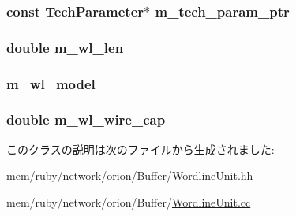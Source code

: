 \label{classWordlineUnit_aab5dce4213ab482c5e1909bfc96d62af}
\hypertarget{classWordlineUnit_a11d1644aa2bfe0e16783dface6fadf13}{
\subsubsection[{m\_\-tech\_\-param\_\-ptr}]{\setlength{\rightskip}{0pt plus 5cm}const {\bf TechParameter}$\ast$ {\bf m\_\-tech\_\-param\_\-ptr}}}
\label{classWordlineUnit_a11d1644aa2bfe0e16783dface6fadf13}
\hypertarget{classWordlineUnit_af094edaeaf3975456c048ce02fa9585c}{
\subsubsection[{m\_\-wl\_\-len}]{\setlength{\rightskip}{0pt plus 5cm}double {\bf m\_\-wl\_\-len}}}
\label{classWordlineUnit_af094edaeaf3975456c048ce02fa9585c}
\hypertarget{classWordlineUnit_a0641127826ee8c6f7635f4f7997d94c3}{
\subsubsection[{m\_\-wl\_\-model}]{ {\bf m\_\-wl\_\-model}}}
\label{classWordlineUnit_a0641127826ee8c6f7635f4f7997d94c3}
\hypertarget{classWordlineUnit_a156bb193afe5dc1b16642b7a42e3fc0f}{
\subsubsection[{m\_\-wl\_\-wire\_\-cap}]{\setlength{\rightskip}{0pt plus 5cm}double {\bf m\_\-wl\_\-wire\_\-cap}}}
\label{classWordlineUnit_a156bb193afe5dc1b16642b7a42e3fc0f}


このクラスの説明は次のファイルから生成されました:\begin{DoxyCompactItemize}
\item 
mem/ruby/network/orion/Buffer/\hyperlink{WordlineUnit_8hh}{WordlineUnit.hh}\item 
mem/ruby/network/orion/Buffer/\hyperlink{WordlineUnit_8cc}{WordlineUnit.cc}\end{DoxyCompactItemize}
